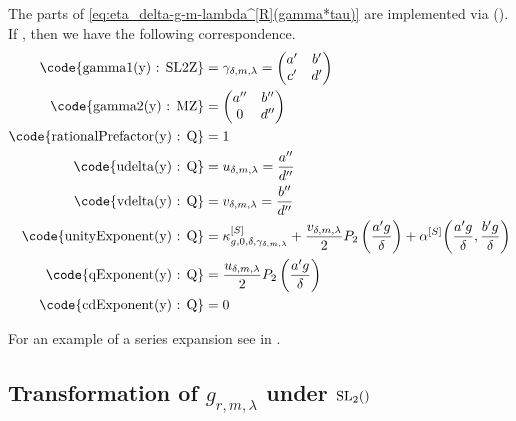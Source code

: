 \documentclass{article}
\begin{document}
The parts of \eqref{eq:eta_delta-g-m-lambda^[R](gamma*tau)} are
implemented via \textcolor{blue}{}
().
\\
If , then we have the following
correspondence.
\begin{align*}
  \text{\code{gamma1(y) : SL2Z}}
  &=
    \gamma_{\delta,m,\lambda} = \begin{pmatrix}a'&b'\\c'&d'\end{pmatrix}
  \\
  \text{\code{gamma2(y) : MZ}}
  &=
    \begin{pmatrix}a''&b''\\0&d''\end{pmatrix}
  \\
  \text{\code{rationalPrefactor(y) : Q}}
  &=
    1
  \\
  \text{\code{udelta(y) : Q}}
  &=
    u_{\delta,m,\lambda} = \frac{a''}{d''}
  \\
  \text{\code{vdelta(y) : Q}}
  &=
    v_{\delta,m,\lambda} = \frac{b''}{d''}
  \\
  \text{\code{unityExponent(y) : Q}}
  &=
    \kappa_{g,0,\delta,\gamma_{\delta,m,\lambda}}^{[S]}
    +
    \frac{v_{\delta,m,\lambda}}{2} P_2\left(\frac{a' g}{\delta}\right)
    +
    \alphaSchoenebergContribution{\frac{a' g}{\delta}}{\frac{b' g}{\delta}}
     \\
  \text{\code{qExponent(y) : Q}}
  &=
    \frac{u_{\delta,m,\lambda}}{2} P_2\left(\frac{a' g}{\delta}\right)
  \\
  \text{\code{cdExponent(y) : Q}}
  &=
    0
\end{align*}

For an example of a series expansion see
 in
.



















\subsection{Transformation of $g_{r,m,\lambda}$ under $\SL2Z$}
\end{document}
